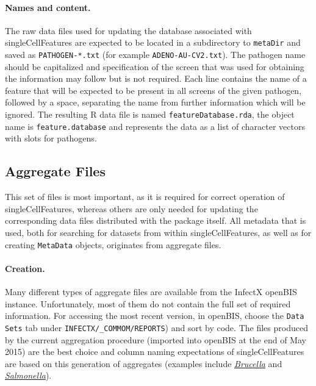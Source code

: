 \paragraph{Names and content.}
The raw data files used for updating the database associated with singleCellFeatures are expected to be located in a subdirectory to \texttt{metaDir} and saved as \texttt{PATHOGEN-*.txt} (for example \texttt{ADENO-AU-CV2.txt}). The pathogen name should be capitalized and specification of the screen that was used for obtaining the information may follow but is not required. Each line contains the name of a feature that will be expected to be present in all screens of the given pathogen, followed by a space, separating the name from further information which will be ignored. The resulting R data file is named \texttt{featureDatabase.rda}, the object name is \texttt{feature.database} and represents the data as a list of character vectors with slots for pathogens.

\subsection{Aggregate Files}
This set of files is most important, as it is required for correct operation of singleCellFeatures, whereas others are only needed for updating the corresponding data files distributed with the package itself. All metadata that is used, both for searching for datasets from within singleCellFeatures, as well as for creating \texttt{MetaData} objects, originates from aggregate files.

\paragraph{Creation.}
Many different types of aggregate files are available from the InfectX openBIS instance. Unfortunately, most of them do not contain the full set of required information. For accessing the most recent version, in openBIS, choose the \texttt{Data Sets} tab under \texttt{INFECTX/_COMMOM/REPORTS}) and sort by code. The files produced by the current aggregation procedure (imported into openBIS at the end of May 2015) are the best choice and column naming expectations of singleCellFeatures are based on this generation of aggregates (examples include \href{https://infectx.biozentrum.unibas.ch/openbis/index.html#entity=DATA_SET&permId=20150522094328451-3135287}{\textit{Brucella}} and \href{https://infectx.biozentrum.unibas.ch/openbis/index.html#entity=DATA_SET&permId=20150522100633413-3135295}{\textit{Salmonella}}).

